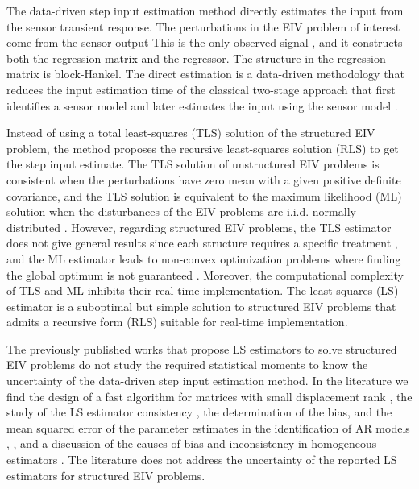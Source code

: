 The data-driven step input estimation method directly estimates the input from the sensor transient response. 
The perturbations in the EIV problem of interest come from the sensor output
This is the only observed signal \citep{Markovsky15cep}, and it constructs both the regression matrix and the regressor.
The structure in the regression matrix is block-Hankel.
The direct estimation is a data-driven methodology that reduces the input estimation time of the classical two-stage approach that first identifies a sensor model and later estimates the input using the sensor model \citep{Azam15, Niedzwiecki16a}.

Instead of using a total least-squares (TLS) solution of the structured EIV problem, the method proposes the recursive least-squares solution (RLS) to get the step input estimate. 
The TLS solution of unstructured EIV problems is consistent when the perturbations have zero mean with a given positive definite covariance, and
the TLS solution is equivalent to the maximum likelihood (ML) solution when the disturbances of the EIV problems are i.i.d. normally distributed \citep{Markovsky07overview}. 
However, regarding structured EIV problems, the TLS estimator does not give general results since each structure requires a specific treatment \citep{VanHuffel07TLSeditorial}, and the ML estimator leads to non-convex optimization problems where finding the global optimum is not guaranteed \citep{Rhode14recursive}.
Moreover, the computational complexity of TLS and ML inhibits their real-time implementation.
The least-squares (LS) estimator is a suboptimal but simple solution to structured EIV problems that admits a recursive form (RLS) suitable for real-time implementation.

The previously published works that propose LS estimators to solve structured EIV problems do not study the required statistical moments to know the uncertainty of the data-driven step input estimation method.
In the literature we find 
the design of a fast algorithm for matrices with small displacement rank \citep{Mastronardi07fast}, 
the study of the LS estimator consistency \citep{Palanthandalam10parameter},
the determination of the bias, and the mean squared error of the parameter estimates in the identification of AR models \citep{Kiviet12high}, \citep{Kiviet14improved}, and
a discussion of the causes of bias and inconsistency in homogeneous estimators \citep{Yeredor04homogeneous}.
The literature does not address the uncertainty of the reported LS estimators for structured EIV problems.

